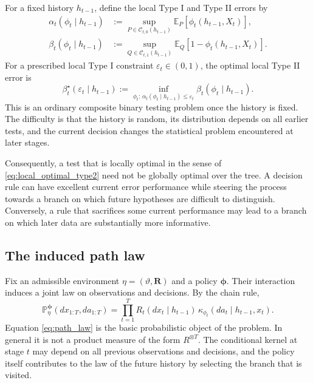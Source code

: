 \documentclass[11pt]{article}
\newcommand{\Prob}{\mathbb{P}}
\newcommand{\E}{\mathbb{E}}
\newcommand{\cC}{\mathcal{C}}
\begin{document}
For a fixed history $h_{t-1}$, define the local Type I and Type II errors by
\begin{align}
\alpha_t(\phi_t\mid h_{t-1})
&:=
\sup_{P\in\cC_{t,0}(h_{t-1})}
\E_P\!\left[\phi_t(h_{t-1},X_t)\right],
\label{eq:local_type1}\\
\beta_t(\phi_t\mid h_{t-1})
&:=
\sup_{Q\in\cC_{t,1}(h_{t-1})}
\E_Q\!\left[1-\phi_t(h_{t-1},X_t)\right].
\label{eq:local_type2}
\end{align}
For a prescribed local Type I constraint $\varepsilon_t\in(0,1)$, the optimal local Type II error is
\begin{equation}
\beta_t^{\star}(\varepsilon_t\mid h_{t-1})
:=
\inf_{\phi_t:\,\alpha_t(\phi_t\mid h_{t-1})\le\varepsilon_t}
\beta_t(\phi_t\mid h_{t-1}).
\label{eq:local_optimal_type2}
\end{equation}
This is an ordinary composite binary testing problem once the history is fixed. The difficulty is that the history is random, its distribution depends on all earlier tests, and the current decision changes the statistical problem encountered at later stages.

Consequently, a test that is locally optimal in the sense of \eqref{eq:local_optimal_type2} need not be globally optimal over the tree. A decision rule can have excellent current error performance while steering the process towards a branch on which future hypotheses are difficult to distinguish. Conversely, a rule that sacrifices some current performance may lead to a branch on which later data are substantially more informative.

\subsection{The induced path law}

Fix an admissible environment $\eta=(\vartheta,\mathbf{R})$ and a policy $\boldsymbol{\phi}$. Their interaction induces a joint law on observations and decisions. By the chain rule,
\begin{equation}
\Prob_{\eta}^{\boldsymbol{\phi}}
(dx_{1:T},da_{1:T})
=
\prod_{t=1}^{T}
R_t(dx_t\mid h_{t-1})
\,\kappa_{\phi_t}(da_t\mid h_{t-1},x_t).
\label{eq:path_law}
\end{equation}
Equation \eqref{eq:path_law} is the basic probabilistic object of the problem. In general it is not a product measure of the form $R^{\otimes T}$. The conditional kernel at stage $t$ may depend on all previous observations and decisions, and the policy itself contributes to the law of the future history by selecting the branch that is visited.
\end{document}
